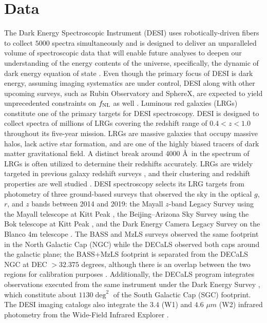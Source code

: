 \section{Data}
\label{sec:data}

The Dark Energy Spectroscopic Instrument (DESI) uses robotically-driven fibers to collect $5000$ spectra simultaneously and is designed to deliver an unparalleled volume of spectroscopic data that will enable future analyses to deepen our understanding of the energy contents of the universe, specifically, the dynamic of dark energy equation of state \citep{aghamousa2016desi}. Even though the primary focus of DESI is dark energy, assuming imaging systematics are under control, DESI along with other upcoming surveys, such as Rubin Observatory and SphereX, are expected to yield unprecedented constraints on $f_{\rm NL}$ as well \citep[see, e.g.,][]{Heinrich2022AAS...24020203H}. Luminous red galaxies (LRGs) constitute one of the primary targets for DESI spectroscopy. DESI is designed to collect spectra of millions of LRGs covering the redshift range of $0.4<z<1.0$ throughout its five-year mission. LRGs are massive galaxies that occupy massive halos, lack active star formation, and are one of the highly biased tracers of dark matter gravitational field. A distinct break around 4000 \AA~in the spectrum of LRGs is often utilized to determine their redshifts accurately. LRGs are widely targeted in previous galaxy redshift surveys \citep[see, e.g.,][]{eisenstein2001spectroscopic, prakash2016sdss}, and their clustering and redshift properties are well studied \citep[see, e.g.,][]{ross2020MNRAS.498.2354R, gilmarin2020MNRAS.498.2492G, bautista2021MNRAS.500..736B, chapman2022MNRAS.516..617C}. DESI spectroscopy selects its LRG targets from photometry of three ground-based surveys that observed the sky in the optical $g$, $r$, and $z$ bands between 2014 and 2019: the Mayall $z$-band Legacy Survey using the Mayall telescope at Kitt Peak \citep[MzLS;][]{dey2018overview}, the Beijing–Arizona Sky Survey using the Bok telescope at Kitt Peak \citep[BASS;][]{zou2017project}, and the Dark Energy Camera Legacy Survey on the Blanco 4m telescope \citep[DECaLS][]{flaugher2015dark}. The BASS and MzLS surveys observed the same footprint in the North Galactic Cap (NGC) while the DECaLS observed both caps around the galactic plane; the BASS+MzLS footprint is separated from the DECaLS NGC at DEC $> 32.375$ degrees, although there is an overlap between the two regions for calibration purposes \citep{dey2018overview}. Additionally, the DECaLS program integrates observations executed from the same instrument under the Dark Energy Survey \citep{abbott2016dark}, which constitute about $1130 \deg^{2}$ of the South Galactic Cap (SGC) footprint. The DESI imaging catalogs also integrate the $3.4$ (W1) and $4.6$ $\mu m$ (W2) infrared photometry from the Wide-Field Infrared Explorer \citep[WISE;][]{wise2010AJ....140.1868W, meisner2018RNAAS...2....1M}.  

